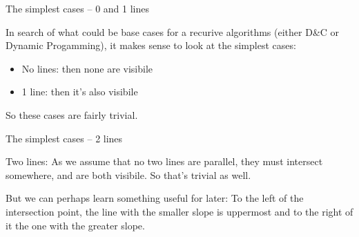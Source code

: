 \documentclass[ignorenonframetext,]{beamer}
\begin{document}
\begin{frame}{The simplest cases -- 0 and 1 lines}

In search of what could be base cases for a recurive algorithms
(either D\&C or Dynamic Progamming), it makes sense to look at the
simplest cases:

\begin{itemize}
\item No lines: then none are visibile
\item 1 line: then it's also visibile
\end{itemize}
So these cases are fairly trivial.
\end{frame}

\begin{frame}{The simplest cases -- 2 lines}

Two lines: As we assume that no two lines are parallel, they must
intersect somewhere, and are both visibile. So that's trivial as well.


But we can perhaps learn something useful for later: To the left of
the intersection point, the line with the smaller slope is uppermost
and to the right of it the one with the greater slope.
\end{frame}
\end{document}
